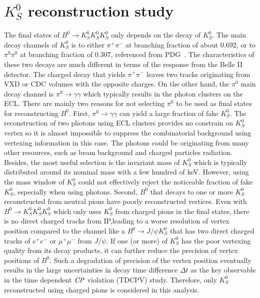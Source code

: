 \chapter{$K_S^0$ reconstruction study}

The final states of $B^0 \to K_S^0  K_S^0  K_S^0 $ only depends on the decay of $K_S^0$. The main decay channels of $K_S^0$ is to either $\pi^+ \pi^-$ at branching fraction of about 0.692, or to $\pi^0 \pi^0$ at branching fraction of 0.307, referenced from PDG~\cite{pdg}.
 The characteristics of these two decays are much different in terms of the response from the Belle II detector. The charged decay that yields  $\pi^+ \pi^-$ leaves two tracks originating from VXD or CDC volumes with the opposite charges. On the other hand, the $\pi^0$ main decay channel is $\pi^0 \to \gamma \gamma$ which typically results in the photon clusters on the ECL. There are mainly two reasons for not selecting $\pi^0$ to be used as final states for reconstructing $B^0$.
 First, $\pi^0 \to \gamma \gamma$ can yield a large fraction of fake $K_S^0$. The reconstruction of two photons using ECL clusters provides no constrain on $K_S^0$ vertex so it is almost impossible to suppress the combinatorial background using vertexing information in this case. The photons could be originating from many other resources, such as beam background and charged particles radiation. Besides, the most useful selection is the invariant mass of $K_S^0$ which is typically distributed around its nominal mass with a few hundred of keV. However, using the mass window of $K_S^0$ could not effectively reject the noticeable fraction of fake $K_S^0$, especially when using photons. Second, $B^0$ that decays to one or more $K_S^0$ reconstructed from neutral pions have poorly reconstructed vertices. Even with $B^0 \to K_S^0  K_S^0  K_S^0 $ which only uses $K_S^0$ from charged pions in the final states, there is no direct charged tracks from IP,leading to a worse resolution of vertex position compared to the channel like a $B^0 \to J/\psi K_S^0$ that has two direct charged tracks of $e^+e^-$ or $\mu^+ \mu^-$ from $J/\psi$. If one (or more) of $K^0_S$ has the poor vertexing quality from its decay products, it can further reduce the precision of vertex positions of $B^0$. Such a degradation of precision of the vertex position eventually results in the large uncertainties in decay time difference $\Delta t$ as the key observable in the time dependent $\it{CP}$ violation (TDCPV) study. Therefore, only $K_S^0$ reconstructed using charged pions is considered in this analysis.
 

